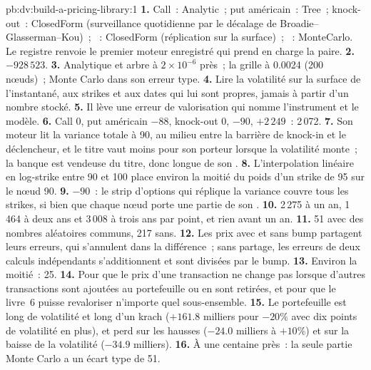 \begin{solution}{pb:dv:build-a-pricing-library:1}
\textbf{1.} Call~: Analytic~; put américain~: Tree~; knock-out~: ClosedForm (surveillance quotidienne par le décalage de Broadie--Glasserman--Kou)~; ~: ClosedForm
(réplication sur la surface)~; ~: MonteCarlo. Le registre renvoie le premier moteur enregistré qui prend en charge la paire.
\textbf{2.} $-928\,523$.
\textbf{3.} Analytique et arbre à $2\times10^{-6}$ près~; la grille à 0.0024 (200 nœuds)~; Monte Carlo dans son erreur type.
\textbf{4.} Lire la volatilité sur la surface de l'instantané, aux strikes et aux dates qui lui sont propres, jamais à partir d'un nombre stocké.
\textbf{5.} Il lève une erreur de valorisation qui nomme l'instrument et le modèle.
\textbf{6.} Call 0, put américain $-88$, knock-out 0,  $-90$,  $+2\,249$~: 2\,072.
\textbf{7.} Son moteur lit la variance totale à 90, au milieu entre la barrière de knock-in et le déclencheur, et le titre vaut moins pour son porteur lorsque la volatilité
monte~; la banque est vendeuse du titre, donc longue de son .
\textbf{8.} L'interpolation linéaire en log-strike entre 90 et 100 place environ la moitié du poids d'un strike de 95 sur le nœud 90.
\textbf{9.} $-90$~: le strip d'options qui réplique la variance couvre tous les strikes, si bien que chaque nœud porte une partie de son .
\textbf{10.} 2\,275 à un an, 1\,464 à deux ans et 3\,008 à trois ans par point, et rien avant un an.
\textbf{11.} 51 avec des nombres aléatoires communs, 217 sans.
\textbf{12.} Les prix avec et sans bump partagent leurs erreurs, qui s'annulent dans la différence~; sans partage, les erreurs de deux calculs indépendants
s'additionnent et sont divisées par le bump.
\textbf{13.} Environ la moitié~: 25.
\textbf{14.} Pour que le prix d'une transaction ne change pas lorsque d'autres transactions sont ajoutées au portefeuille ou en sont retirées, et pour que le livre~6 puisse revaloriser n'importe quel sous-ensemble.
\textbf{15.} Le portefeuille est long de volatilité et long d'un krach ($+161.8$ milliers pour $-20\%$ avec dix points de volatilité en plus), et perd sur les hausses
($-24.0$ milliers à $+10\%$) et sur la baisse de la volatilité ($-34.9$ milliers).
\textbf{16.} À une centaine près~: la seule partie Monte Carlo a un écart type de 51.

\end{solution}
